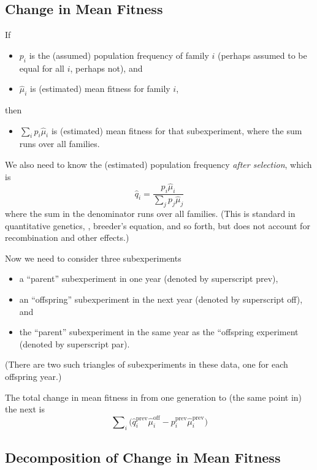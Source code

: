 \documentclass[11pt]{article}
\begin{document}
\subsection{Change in Mean Fitness}

If
\begin{itemize}
\item $p_i$ is the (assumed) population frequency of family $i$
    (perhaps assumed to be equal for all $i$, perhaps not), and
\item $\hat{\mu}_i$ is (estimated) mean fitness for family $i$,
\end{itemize}
then
\begin{itemize}
\item $\sum_i p_i \hat{\mu}_i$ is (estimated) mean fitness for
that subexperiment, where the sum runs over all families.
\end{itemize}

We also need to know the (estimated) population frequency
\emph{after selection}, which is
$$
   \hat{q}_i = \frac{p_i \hat{\mu}_i}{\sum_j p_j \hat{\mu}_j}
$$
where the sum in the denominator runs over all families.
(This is standard in quantitative genetics, \citet{lande-arnold},
breeder's equation,
and so forth, but does not account for recombination and other effects.)

Now we need to consider three subexperiments
\begin{itemize}
\item a ``parent'' subexperiment in one year (denoted by superscript prev),
\item an ``offspring'' subexperiment in the next year (denoted
    by superscript off), and
\item the ``parent'' subexperiment in the same year as the ``offspring
    experiment (denoted by superscript par).
\end{itemize}
(There are two such triangles of subexperiments in these data, one
for each offspring year.)

The total change in mean fitness in from one generation to (the same point in) the next is
\begin{equation} \label{eq:total-change}
   \sum\nolimits_i \bigl(
   \hat{q}_i^\text{prev} \hat{\mu}_i^\text{off}
   -
   p_i^\text{prev} \hat{\mu}_i^\text{prev}
   \bigr)
\end{equation}

\subsection{Decomposition of Change in Mean Fitness}
\end{document}
